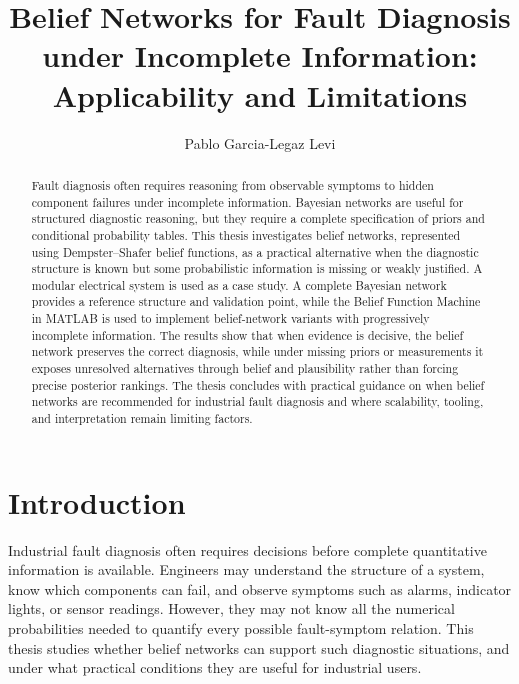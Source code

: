 \documentclass[runningheads]{llncs}
\begin{document}
\title{Belief Networks for Fault Diagnosis under Incomplete Information: Applicability and Limitations}

\author{Pablo Garcia-Legaz Levi}


\maketitle

\begin{abstract}
Fault diagnosis often requires reasoning from observable symptoms to hidden component failures under incomplete information. Bayesian networks are useful for structured diagnostic reasoning, but they require a complete specification of priors and conditional probability tables. This thesis investigates belief networks, represented using Dempster--Shafer belief functions, as a practical alternative when the diagnostic structure is known but some probabilistic information is missing or weakly justified. A modular electrical system is used as a case study. A complete Bayesian network provides a reference structure and validation point, while the Belief Function Machine in MATLAB is used to implement belief-network variants with progressively incomplete information. The results show that when evidence is decisive, the belief network preserves the correct diagnosis, while under missing priors or measurements it exposes unresolved alternatives through belief and plausibility rather than forcing precise posterior rankings. The thesis concludes with practical guidance on when belief networks are recommended for industrial fault diagnosis and where scalability, tooling, and interpretation remain limiting factors.

\end{abstract}

\section{Introduction}
\label{sec:introduction}

Industrial fault diagnosis often requires decisions before complete quantitative information is available. Engineers may understand the structure of a system, know which components can fail, and observe symptoms such as alarms, indicator lights, or sensor readings. However, they may not know all the numerical probabilities needed to quantify every possible fault-symptom relation. This thesis studies whether belief networks can support such diagnostic situations, and under what practical conditions they are useful for industrial users.
\end{document}
